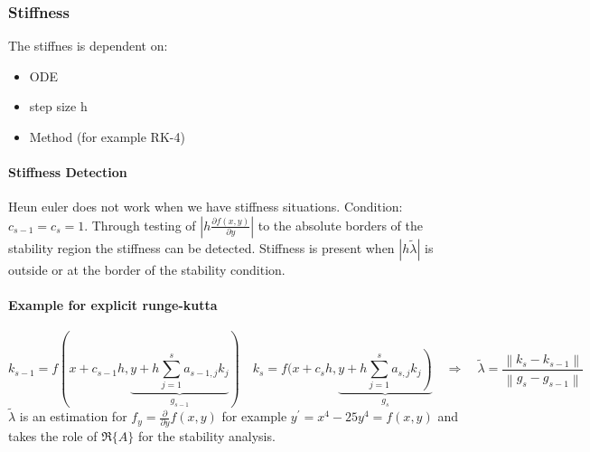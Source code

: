 \subsubsection{Stiffness}\label{subsubsec:stiffnes}

The stiffnes is dependent on:
\begin{itemize}
    \item ODE
    \item step size h
    \item Method (for example RK-4)
\end{itemize}
\paragraph{Stiffness Detection}\mbox{}\newline
Heun euler does not work when we have stiffness situations.
Condition: $c_{s-1}=c_{s}=1$. Through testing of $\left|h \frac{\partial f(x, y)}{\partial y}\right|$ to the absolute borders of the stability region the stiffness can be detected. Stiffness is present when $|h \tilde{\lambda}|$ is outside or at the border of the stability condition.

\paragraph{Example for explicit runge-kutta}\mbox{}\newline
$$
k_{s-1}=f(x+c_{s-1} h, \underbrace{y+h \sum_{j=1}^{s} a_{s-1, j} k_{j}}_{g_{s-1}}) \quad k_{s}=f(x+c_{s} h, \underbrace{\left.y+h \sum_{j=1}^{s} a_{s, j} k_{j}\right)}_{g_{s}} \quad \Rightarrow \quad \tilde{\lambda}=\frac{\left\|k_{s}-k_{s-1}\right\|}{\left\|g_{s}-g_{s-1}\right\|}
$$
$\tilde{\lambda}$ is an estimation for $f_{y}=\frac{\partial}{\partial y} f(x, y)$ for example $y^{\prime}=x^{4}-25 y^{4}=f(x, y)$ and takes the role of $\Re\{A\}$ for the stability analysis.




